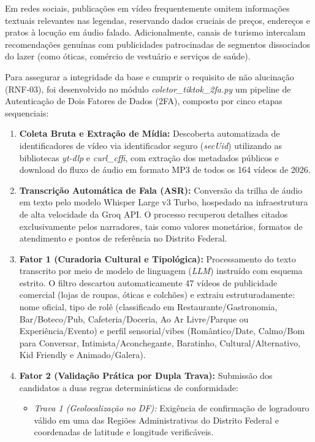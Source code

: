 \documentclass[12pt,a4paper]{article}
\begin{document}
Em redes sociais, publicações em vídeo frequentemente omitem informações textuais relevantes nas legendas, reservando dados cruciais de preços, endereços e pratos à locução em áudio falado. Adicionalmente, canais de turismo intercalam recomendações genuínas com publicidades patrocinadas de segmentos dissociados do lazer (como óticas, comércio de vestuário e serviços de saúde). 

Para assegurar a integridade da base e cumprir o requisito de não alucinação (RNF-03), foi desenvolvido no módulo \textit{coletor\_tiktok\_2fa.py} um pipeline de Autenticação de Dois Fatores de Dados (2FA), composto por cinco etapas sequenciais:

\begin{enumerate}[label=\alph*)]
\item \textbf{Coleta Bruta e Extração de Mídia:} Descoberta automatizada de identificadores de vídeo via identificador seguro (\textit{secUid}) utilizando as bibliotecas \textit{yt-dlp} e \textit{curl\_cffi}, com extração dos metadados públicos e download do fluxo de áudio em formato MP3 de todos os 164 vídeos de 2026.
\item \textbf{Transcrição Automática de Fala (ASR):} Conversão da trilha de áudio em texto pelo modelo Whisper Large v3 Turbo, hospedado na infraestrutura de alta velocidade da Groq API. O processo recuperou detalhes citados exclusivamente pelos narradores, tais como valores monetários, formatos de atendimento e pontos de referência no Distrito Federal.
\item \textbf{Fator 1 (Curadoria Cultural e Tipológica):} Processamento do texto transcrito por meio de modelo de linguagem (\textit{LLM}) instruído com esquema estrito. O filtro descartou automaticamente 47 vídeos de publicidade comercial (lojas de roupas, óticas e colchões) e extraiu estruturadamente: nome oficial, tipo de rolê (classificado em Restaurante/Gastronomia, Bar/Boteco/Pub, Cafeteria/Doceria, Ao Ar Livre/Parque ou Experiência/Evento) e perfil sensorial/vibes (Romântico/Date, Calmo/Bom para Conversar, Intimista/Aconchegante, Baratinho, Cultural/Alternativo, Kid Friendly e Animado/Galera).
\item \textbf{Fator 2 (Validação Prática por Dupla Trava):} Submissão dos candidatos a duas regras determinísticas de conformidade:
\begin{itemize}
\item \textit{Trava 1 (Geolocalização no DF):} Exigência de confirmação de logradouro válido em uma das Regiões Administrativas do Distrito Federal e coordenadas de latitude e longitude verificáveis.

\end{itemize}
\end{enumerate}
\end{document}
